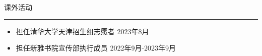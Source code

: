 \documentclass{resume} %
\renewenvironment{rSection}[1]{
\sectionskip
\textcolor{TsinghuaPurple}{\MakeUppercase{#1}}
\sectionlineskip
\hrule
\begin{list}{}{
\setlength{\leftmargin}{0em}
}
\item[]
}{
\end{list}
}
\begin{document}

\begin{rSection}{课外活动} \itemsep -2pt   

\begin{itemize}
\item 担任清华大学天津招生组志愿者 \hfill 2023年8月
\item 担任新雅书院宣传部执行成员 \hfill 2022年9月-2023年9月  
\end{itemize}  

\end{rSection} 
\end{document}
